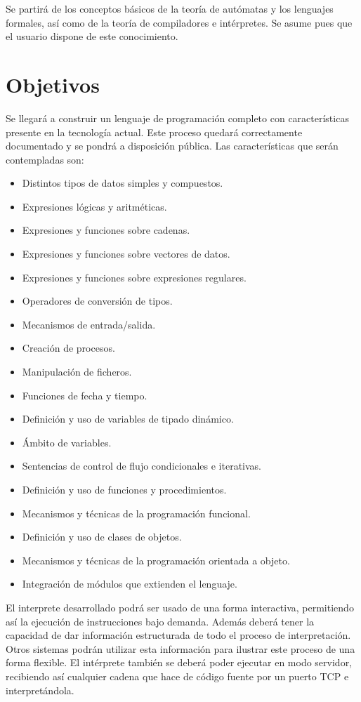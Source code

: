 Se partirá de los conceptos básicos de la teoría de autómatas y los lenguajes formales, así como de la teoría de compiladores e intérpretes. Se asume pues que el usuario dispone
de este conocimiento.

\section{Objetivos}
Se llegará a construir un lenguaje de programación completo con características presente en la tecnología actual. Este proceso quedará correctamente documentado y se pondrá a disposición pública.
Las características que serán contempladas son:

\begin{itemize}
\item Distintos tipos de datos simples y compuestos.
\item Expresiones lógicas y aritméticas.
\item Expresiones y funciones sobre cadenas.
\item Expresiones y funciones sobre vectores de datos.
\item Expresiones y funciones sobre expresiones regulares.
\item Operadores de conversión de tipos.
\item Mecanismos de entrada/salida.
\item Creación de procesos.
\item Manipulación de ficheros.
\item Funciones de fecha y tiempo.
\item Definición y uso de variables de tipado dinámico.
\item Ámbito de variables.
\item Sentencias de control de flujo condicionales e iterativas.
\item Definición y uso de funciones y procedimientos.
\item Mecanismos y técnicas de la programación funcional.
\item Definición y uso de clases de objetos.
\item Mecanismos y técnicas de la programación orientada a objeto.
\item Integración de módulos que extienden el lenguaje.
\end{itemize} \hfill 

El interprete desarrollado podrá ser usado de una forma interactiva, permitiendo así la ejecución de
instrucciones bajo demanda. Además deberá tener la capacidad de dar información
estructurada de todo el proceso de interpretación. Otros sistemas podrán utilizar
esta información para ilustrar este proceso de una forma flexible. El intérprete también 
se deberá poder ejecutar en modo servidor, recibiendo así cualquier cadena que hace de código fuente por un puerto TCP e interpretándola.  


